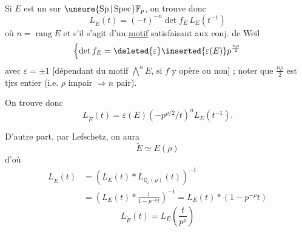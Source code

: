 
Si $E$ est un   sur $\unsure{\operatorname{Sp}|\operatorname{Spec}}\mathbb{F}_p$,  on trouve donc
\[
L_{\check E}(t)=(-t)^{-n}\det f_E\,L_E(t^{-1})
\]
où $n=\operatorname{rang}E$ et s'il s'agit d'un \uline{motif}  satisfaisant aux conj. de Weil
\[
\left\{\det f_E=\deleted{\varepsilon}\inserted{\varepsilon(E)}p^{\frac{n\rho}{2}}\right.
\]
avec $\varepsilon=\pm1$ [dépendant du motif $\bigwedge^n E$,  si $f$ y opère  ou non] ; noter que $\frac{n\rho}{2}$ est tjrs entier (i.e. $\rho$ impair $\Longrightarrow n$ pair).

On trouve donc
\[
L_{\check E}(t)=\varepsilon(E)(-p^{\rho/2}/t)^n L_E(t^{-1}).
\]

D'autre part, par Lefschetz, on aura
\[
\check E\simeq E(\rho)
\]
d'où
\[
\begin{aligned}
L_{\check E}(t)&=\left(L_E(t)*L_{\mathbb{Q}_{\ell}(\rho)}(t)\right)^{-1}\\
&=\left(L_E(t)*\frac{1}{1-p^{-\rho}t}\right)^{-1}=L_E(t)*(1-p^{-\rho}t)
\end{aligned}
\]
\[
L_{\check E}(t)=L_E\left(\frac{t}{p^{\rho}}\right)
\]

